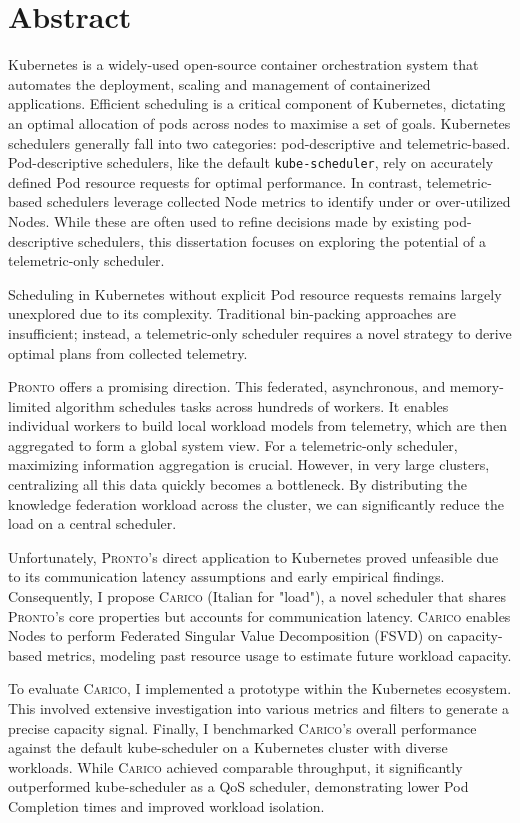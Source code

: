\chapter*{Abstract}

Kubernetes is a widely-used open-source container orchestration system
that automates the deployment, scaling and management of containerized
applications. Efficient scheduling is a critical component of Kubernetes,
dictating an optimal allocation of pods across nodes to maximise a set of goals.
Kubernetes schedulers generally fall into two categories: pod-descriptive and
telemetric-based. Pod-descriptive schedulers, like the default
\texttt{kube-scheduler}, rely on accurately defined Pod resource requests for
optimal performance. In contrast, telemetric-based schedulers leverage collected
Node metrics to identify under or over-utilized Nodes. While these are often
used to refine decisions made by existing pod-descriptive schedulers, this
dissertation focuses on exploring the potential of a telemetric-only scheduler.

Scheduling in Kubernetes without explicit Pod resource requests remains largely
unexplored due to its complexity. Traditional bin-packing approaches are
insufficient; instead, a telemetric-only scheduler requires a novel strategy to
derive optimal plans from collected telemetry.

\textsc{Pronto} offers a promising direction. This federated, asynchronous, and
memory-limited algorithm schedules tasks across hundreds of workers. It enables
individual workers to build local workload models from telemetry, which are then
aggregated to form a global system view. For a telemetric-only scheduler,
maximizing information aggregation is crucial. However, in very large clusters,
centralizing all this data quickly becomes a bottleneck. By distributing the
knowledge federation workload across the cluster, we can significantly reduce
the load on a central scheduler.

Unfortunately, \textsc{Pronto}'s direct application to Kubernetes proved unfeasible due
to its communication latency assumptions and early empirical findings.
Consequently, I propose \textsc{Carico} (Italian for "load"), a novel scheduler that
shares \textsc{Pronto}'s core properties but accounts for communication latency. \textsc{Carico}
enables Nodes to perform Federated Singular Value Decomposition (FSVD) on
capacity-based metrics, modeling past resource usage to estimate future
workload capacity.

To evaluate \textsc{Carico}, I implemented a prototype within the Kubernetes ecosystem.
This involved extensive investigation into various metrics and filters to
generate a precise capacity signal. Finally, I benchmarked \textsc{Carico}'s overall
performance against the default kube-scheduler on a Kubernetes cluster with
diverse workloads. While \textsc{Carico} achieved comparable throughput, it significantly
outperformed kube-scheduler as a QoS scheduler, demonstrating lower Pod
Completion times and improved workload isolation.
